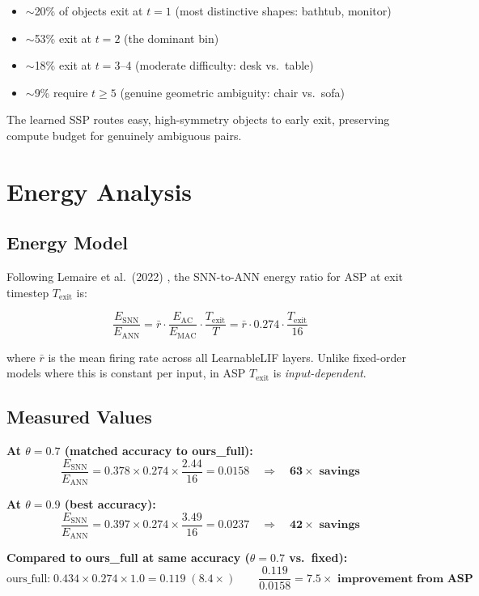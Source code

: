 \documentclass[11pt,a4paper]{article}
\newcommand{\energybox}[1]{%
  \begin{mdframed}[backgroundcolor=lightgray,linecolor=darkblue,linewidth=0.8pt,innertopmargin=6pt,innerbottommargin=6pt]
  #1
  \end{mdframed}
}
\begin{document}
\begin{itemize}
  \item $\sim$20\% of objects exit at $t=1$ (most distinctive shapes: bathtub, monitor)
  \item $\sim$53\% exit at $t=2$ (the dominant bin)
  \item $\sim$18\% exit at $t=3$--4 (moderate difficulty: desk vs.\ table)
  \item $\sim$9\% require $t \geq 5$ (genuine geometric ambiguity: chair vs.\ sofa)
\end{itemize}

The learned SSP routes easy, high-symmetry objects to early exit, preserving compute budget for
genuinely ambiguous pairs.

\section{Energy Analysis}

\subsection{Energy Model}

Following Lemaire et al.\ (2022) \cite{lemaire2022}, the SNN-to-ANN energy ratio for
ASP at exit timestep $T_{\text{exit}}$ is:

\[
  \frac{E_\text{SNN}}{E_\text{ANN}} = \bar{r} \cdot \frac{E_\text{AC}}{E_\text{MAC}} \cdot \frac{T_{\text{exit}}}{T}
  = \bar{r} \cdot 0.274 \cdot \frac{T_{\text{exit}}}{16}
\]

where $\bar{r}$ is the mean firing rate across all LearnableLIF layers. Unlike fixed-order models
where this is constant per input, in ASP $T_{\text{exit}}$ is \emph{input-dependent}.

\subsection{Measured Values}

\energybox{
\textbf{At $\theta=0.7$ (matched accuracy to ours\_full):}
\[
  \frac{E_\text{SNN}}{E_\text{ANN}} = 0.378 \times 0.274 \times \frac{2.44}{16} = 0.0158 \quad\Rightarrow\quad \mathbf{63\times\text{ savings}}
\]

\textbf{At $\theta=0.9$ (best accuracy):}
\[
  \frac{E_\text{SNN}}{E_\text{ANN}} = 0.397 \times 0.274 \times \frac{3.49}{16} = 0.0237 \quad\Rightarrow\quad \mathbf{42\times\text{ savings}}
\]

\textbf{Compared to ours\_full at same accuracy ($\theta=0.7$ vs.\ fixed):}
\[
  \text{ours\_full:}\; 0.434\times0.274\times1.0 = 0.119 \;(8.4\times)
  \qquad
  \frac{0.119}{0.0158} = \mathbf{7.5\times\text{ improvement from ASP}}
\]
}
\end{document}

